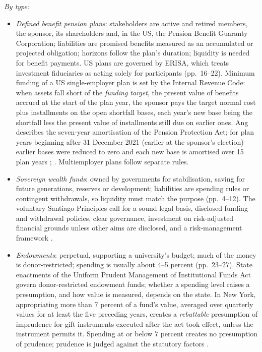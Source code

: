 \begin{qfdefinition}
\emph{By type}:
\begin{itemize}
\item \emph{Defined benefit pension plans}: stakeholders are active and retired members, the sponsor, its shareholders and, in the US, the Pension Benefit Guaranty Corporation; liabilities are promised benefits measured as an accumulated or projected obligation; horizons follow the plan's duration; liquidity is needed for benefit payments. US plans are governed by ERISA, which treats investment fiduciaries as acting solely for participants (pp.~16--22). Minimum funding of a US single-employer plan is set by the Internal Revenue Code: when assets fall short of the \emph{funding target}, the present value of benefits accrued at the start of the plan year, the sponsor pays the target normal cost plus installments on the open shortfall bases, each year's new base being the shortfall less the present value of installments still due on earlier ones. Ang describes the seven-year amortisation of the Pension Protection Act; for plan years beginning after 31 December 2021 (earlier at the sponsor's election) earlier bases were reduced to zero and each new base is amortised over 15 plan years \citep[secs.~430(a), (c)(3), (c)(8), (d)(1)]{us-internal-revenue-code-26}; \citep[secs.~II.B, III.A, III.B.1]{irs-notice-2021-48}. Multiemployer plans follow separate rules.
\item \emph{Sovereign wealth funds}: owned by governments for stabilisation, saving for future generations, reserves or development; liabilities are spending rules or contingent withdrawals, so liquidity must match the purpose (pp.~4--12). The voluntary Santiago Principles call for a sound legal basis, disclosed funding and withdrawal policies, clear governance, investment on risk-adjusted financial grounds unless other aims are disclosed, and a risk-management framework \citep[GAPP~1, 4, 6, 18--19, 22]{santiago-principles-2008}.
\item \emph{Endowments}: perpetual, supporting a university's budget; much of the money is donor-restricted; spending is usually about 4--5 percent (pp.~23--27). State enactments of the Uniform Prudent Management of Institutional Funds Act govern donor-restricted endowment funds; whether a spending level raises a presumption, and how value is measured, depends on the state. In New York, appropriating more than 7 percent of a fund's value, averaged over quarterly values for at least the five preceding years, creates a \emph{rebuttable} presumption of imprudence for gift instruments executed after the act took effect, unless the instrument permits it. Spending at or below 7 percent creates no presumption of prudence; prudence is judged against the statutory factors \citep[sec.~553(a), (d)]{ny-npc-553}.

\end{itemize}
\end{qfdefinition}
